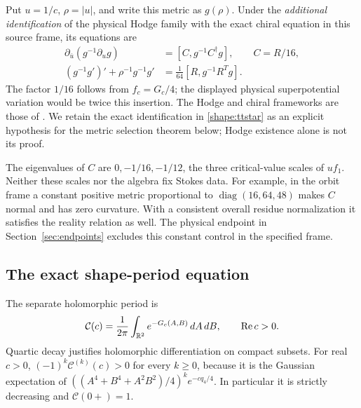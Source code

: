 Put $u=1/c$, $\rho=|u|$, and write this metric as $g(\rho)$. Under
the \emph{additional identification} of the physical Hodge family
with the exact chiral equation in this source frame, its equations are
\begin{align}
\partial_{\bar u}(g^{-1}\partial_u g)
&=[C,g^{-1}C^\dagger g],\qquad C=R/16,\label{shape:ttstar}\\
(g^{-1}g')'+\rho^{-1}g^{-1}g'
&=\tfrac1{64}[R,g^{-1}R^Tg].\label{shape:radial}
\end{align}
The factor $1/16$ follows from $f_c=G_c/4$; the displayed physical
superpotential variation would be twice this insertion.
The Hodge and chiral frameworks are those of
\cite{Fan,CecottiVafa,SonnerTong}. We retain the exact identification
in \eqref{shape:ttstar} as an explicit hypothesis for the metric
selection theorem below; Hodge existence alone is not its proof.

The eigenvalues of $C$ are $0,-1/16,-1/12$, the three critical-value
scales of $u f_1$. Neither these scales nor the algebra fix Stokes
data. For example, in the orbit frame a constant positive metric
proportional to $\operatorname{diag}(16,64,48)$ makes $C$ normal
and has zero curvature. With a consistent overall residue normalization
it satisfies the reality relation as well. The physical endpoint in
Section~\ref{sec:endpoints} excludes this constant control in the
specified frame.

\subsection{The exact shape-period equation}
The separate holomorphic period is
\begin{equation}\label{shape:period}
\mathcal C(c)=\frac1{2\pi}\int_{\mathbb R^2}e^{-G_c(A,B)}\,dA\,dB,
\qquad \operatorname{Re} c>0.
\end{equation}
Quartic decay justifies holomorphic differentiation on compact subsets.
For real $c>0$,
$(-1)^k\mathcal C^{(k)}(c)>0$ for every $k\ge0$, because it is the
Gaussian expectation of $( (A^4+B^4+A^2B^2)/4)^k e^{-cq_4/4}$.
In particular it is strictly decreasing and $\mathcal C(0+)=1$.

